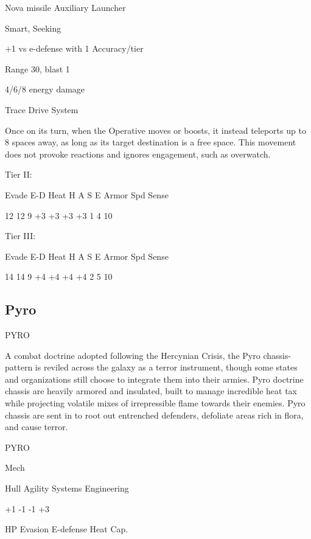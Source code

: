 Nova missile  
Auxiliary Launcher
 
Smart, Seeking
 
+1 vs e-defense with 1 Accuracy/tier
 
Range 30, blast 1
 
4/6/8 energy damage
 

Trace Drive  
System
 
Once on its turn, when the Operative moves or boosts, it instead teleports up to 8 spaces away,  
as long as its target destination is a free space. This movement does not provoke reactions and  
ignores engagement, such as overwatch.
 

Tier II:	
 

          Evade    E-D    Heat     H    A     S     E       Armor        Spd      Sense 

          12       12     9       +3    +3    +3    +3      1            4        10 

Tier III:
 

          Evade    E-D    Heat     H    A     S     E       Armor        Spd      Sense 

          14       14     9       +4    +4    +4    +4      2            5        10 

                                                                                                               
\subsection{Pyro}

                                                   PYRO  

A combat doctrine adopted following the Hercynian Crisis, the Pyro chassis-pattern is reviled  
across the galaxy as a terror instrument, though some states and organizations still choose to  
integrate them into their armies. Pyro doctrine chassis are heavily armored and insulated, built to  
manage incredible heat tax while projecting volatile mixes of irrepressible flame towards their  
enemies. Pyro chassis are sent in to root out entrenched defenders, defoliate areas rich in flora,  
and cause terror. 
 

 PYRO 

 Mech 

 Hull       Agility      Systems       Engineering 

 +1         -1           -1            +3 

 HP         Evasion      E-defense     Heat Cap. 

